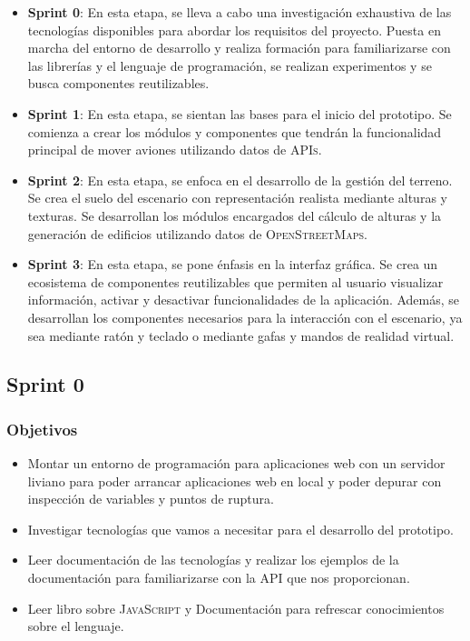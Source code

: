 \documentclass[a4paper, 11pt]{book}
\begin{document}
\begin{itemize}
    \item \textbf{Sprint 0}: En esta etapa, se lleva a cabo una investigación exhaustiva de las tecnologías disponibles para abordar los requisitos del proyecto. Puesta en marcha del entorno de desarrollo y realiza formación para familiarizarse con las librerías y el lenguaje de programación, se realizan experimentos y se busca componentes reutilizables.
    \item \textbf{Sprint 1}: En esta etapa, se sientan las bases para el inicio del prototipo. Se comienza a crear los módulos y componentes que tendrán la funcionalidad principal de mover aviones utilizando datos de \textsc{\gls{API}s}.
    \item \textbf{Sprint 2}: En esta etapa, se enfoca en el desarrollo de la gestión del terreno. Se crea el suelo del escenario con representación realista mediante alturas y texturas. Se desarrollan los módulos encargados del cálculo de alturas y la generación de edificios utilizando datos de \textsc{OpenStreetMaps}.
    \item \textbf{Sprint 3}: En esta etapa, se pone énfasis en la interfaz gráfica. Se crea un ecosistema de componentes reutilizables que permiten al usuario visualizar información, activar y desactivar funcionalidades de la aplicación. Además, se desarrollan los componentes necesarios para la interacción con el escenario, ya sea mediante ratón y teclado o mediante gafas y mandos de realidad virtual.
\end{itemize}

\subsection{Sprint 0}
\subsubsection{Objetivos}
\begin{itemize}
    \item Montar un entorno de programación para aplicaciones web con un servidor liviano para poder arrancar aplicaciones web en local y poder depurar con inspección de variables y puntos de ruptura.
    \item Investigar tecnologías que vamos a necesitar para el desarrollo del prototipo.
    \item Leer documentación de las tecnologías y realizar los ejemplos de la documentación para familiarizarse con la \textsc{API} que nos proporcionan.
    \item Leer libro sobre \textsc{JavaScript} y Documentación para refrescar conocimientos sobre el lenguaje.
\end{itemize}
\end{document}
